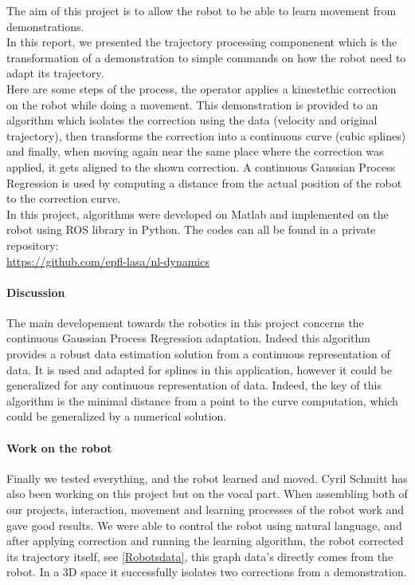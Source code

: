 The aim of this project is to allow the robot to be able to learn movement from demonstrations.\\
In this report, we presented the trajectory processing componenent which is the transformation of a demonstration to simple commands on how the robot need to adapt its trajectory.\\

Here are some steps of the process, the operator applies a kinestethic correction on the robot while doing a movement. This demonstration is provided to an algorithm which isolates the correction using the data (velocity and original trajectory), then transforms the correction into a continuous curve (cubic splines) and finally, when moving again near the same place where the correction was applied, it gets aligned to the shown correction. A continuous Gaussian Process Regression is used by computing a distance from the actual position of the robot to the correction curve.\\

In this project, algorithms were developed on Matlab and implemented on the robot using ROS library in Python. The codes can all be found in a private repository:\\
\url{https://github.com/epfl-lasa/nl-dynamics}


\paragraph*{Discussion}

The main developement towards the robotics in this project concerns the continuous Gaussian Process Regression adaptation. Indeed this algorithm provides a robust data estimation solution from a continuous representation of data. It is used and adapted for splines in this application, however it could be generalized for any continuous representation of data. Indeed, the key of this algorithm is the minimal distance from a point to the curve computation, which could be generalized by a numerical solution.

\paragraph*{Work on the robot}

Finally we tested everything, and the robot learned and moved. Cyril Schmitt has also been working on this project but on the vocal part. When assembling both of our projects, interaction, movement and learning processes of the robot work and gave good results. We were able to control the robot using natural language, and after applying correction and running the learning algorithm, the robot corrected its trajectory itself, see \autoref{Robotsdata}, this graph data's directly comes from the robot. In a 3D space it successfully isolates two corrections from a demonstration.

